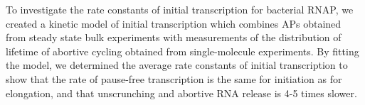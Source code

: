 To investigate the rate constants of initial transcription for bacterial RNAP,
we created a kinetic model of initial transcription which combines APs
obtained from steady state bulk experiments with measurements of the
distribution of lifetime of abortive cycling obtained from single-molecule
experiments. By fitting the model, we determined the average rate constants of
initial transcription to show that the rate of pause-free transcription is the
same for initiation as for elongation, and that unscrunching and abortive RNA
release is 4-5 times slower.





